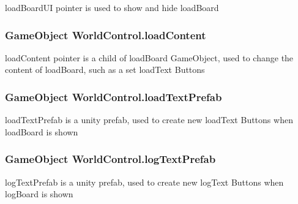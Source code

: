 load\+Board\+UI pointer is used to show and hide load\+Board 

\subsubsection[{\texorpdfstring{load\+Content}{loadContent}}]{\setlength{\rightskip}{0pt plus 5cm}Game\+Object World\+Control.\+load\+Content}\hypertarget{class_world_control_a9cb91fce6b5204e9e5fa122c5bc9e242}{}\label{class_world_control_a9cb91fce6b5204e9e5fa122c5bc9e242}


load\+Content pointer is a child of load\+Board Game\+Object, used to change the content of load\+Board, such as a set load\+Text Buttons 

\subsubsection[{\texorpdfstring{load\+Text\+Prefab}{loadTextPrefab}}]{\setlength{\rightskip}{0pt plus 5cm}Game\+Object World\+Control.\+load\+Text\+Prefab}\hypertarget{class_world_control_add74a4115effd38e736279d2da60aeca}{}\label{class_world_control_add74a4115effd38e736279d2da60aeca}


load\+Text\+Prefab is a unity prefab, used to create new load\+Text Buttons when load\+Board is shown 

\subsubsection[{\texorpdfstring{log\+Text\+Prefab}{logTextPrefab}}]{\setlength{\rightskip}{0pt plus 5cm}Game\+Object World\+Control.\+log\+Text\+Prefab}\hypertarget{class_world_control_ad4dd5b29a3dfc1a483dd22698bbd6113}{}\label{class_world_control_ad4dd5b29a3dfc1a483dd22698bbd6113}


log\+Text\+Prefab is a unity prefab, used to create new log\+Text Buttons when log\+Board is shown 

